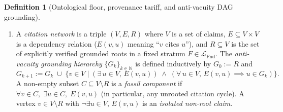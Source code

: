 \documentclass[11pt]{article}
\theoremstyle{plain}
\theoremstyle{definition}
\newtheorem{definition}[theorem]{Definition}
\newcommand{\LFnd}{\mathcal{L}_{\mathrm{Fnd}}}
\begin{document}
\begin{definition}[Ontological floor, provenance tariff, and anti-vacuity DAG grounding]
\begin{enumerate}[nosep,label=(\roman*)]
\item A \emph{citation network} is a triple $(V, E, R)$ where $V$ is a set of claims, $E \subseteq V \times V$ is a dependency relation ($E(v, u)$ meaning ``$v$ cites $u$''), and $R \subseteq V$ is the set of explicitly verified grounded roots in a fixed stratum $F \in \LFnd$. The \emph{anti-vacuity grounding hierarchy} $\{G_k\}_{k \in \mathbb{N}}$ is defined inductively by $G_0 := R$ and
\[
G_{k+1} := G_k \;\cup\; \bigl\{ v \in V \;\big|\; (\exists\, u \in V,\, E(v, u)) \;\wedge\; (\forall\, u \in V,\, E(v, u) \implies u \in G_k) \bigr\}.
\]
A non-empty subset $C \subseteq V \setminus R$ is a \emph{fossil component} if $\forall v \in C,\; \exists u \in C,\; E(v, u)$ (in particular, any unrooted citation cycle). A vertex $v \in V \setminus R$ with $\neg\exists u \in V,\, E(v, u)$ is an \emph{isolated non-root claim}.
\end{enumerate}
\end{definition}
\end{document}
